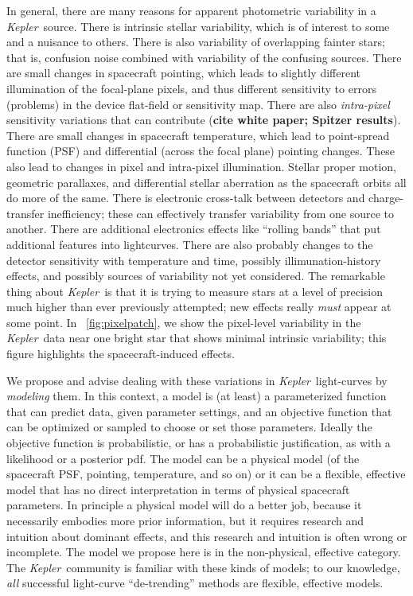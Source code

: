\documentclass[12pt, preprint]{aastex}
\newcommand{\project}[1]{\textsl{#1}}
\newcommand{\Kepler}{\project{Kepler}}
\newcommand{\todo}[1]{\textbf{#1}}
\begin{document}
In general, there are many reasons for apparent photometric variability in a \Kepler\ source.
There is intrinsic stellar variability,
  which is of interest to some and a nuisance to others.
There is also variability of overlapping fainter stars;
  that is, confusion noise combined with variability of the confusing sources.
There are small changes in spacecraft pointing,
  which leads to slightly different illumination of the focal-plane pixels,
  and thus different sensitivity to errors (problems) in the device flat-field or sensitivity map.
There are also \emph{intra-pixel} sensitivity variations that can contribute (\todo{cite white paper; Spitzer results}).
There are small changes in spacecraft temperature,
  which lead to point-spread function (PSF) and differential (across the focal plane) pointing changes.
These also lead to changes in pixel and intra-pixel illumination.
Stellar proper motion, geometric parallaxes, and differential stellar aberration as the spacecraft orbits all do more of the same.
There is electronic cross-talk between detectors and charge-transfer inefficiency;
  these can effectively transfer variability from one source to another.
There are additional electronics effects like ``rolling bands'' that put additional features into lightcurves.
There are also probably changes to the detector sensitivity with temperature and time,
  possibly illimunation-history effects,
  and possibly sources of variability not yet considered.
The remarkable thing about \Kepler\ is that it is trying to measure stars at a level of precision
  much higher than ever previously attempted;
  new effects really \emph{must} appear at some point.
In \figurename~\ref{fig:pixelpatch}, we show the pixel-level variability in the \Kepler\ data
  near one bright star that shows minimal intrinsic variability;
  this figure highlights the spacecraft-induced effects.

We propose and advise dealing with these variations in \Kepler\ light-curves by \emph{modeling} them.
In this context, a model is (at least) a parameterized function that can predict data, given parameter settings,
  and an objective function that can be optimized or sampled to choose or set those parameters.
Ideally the objective function is probabilistic, or has a probabilistic justification,
  as with a likelihood or a posterior pdf.
The model can be a physical model (of the spacecraft PSF, pointing, temperature, and so on)
  or it can be a flexible, effective model that has no direct interpretation in terms of physical spacecraft parameters.
In principle a physical model will do a better job,
  because it necessarily embodies more prior information,
  but it requires research and intuition about dominant effects,
  and this research and intuition is often wrong or incomplete.
The model we propose here is in the non-physical, effective category.
The \Kepler\ community is familiar with these kinds of models;
  to our knowledge, \emph{all} successful light-curve ``de-trending'' methods
  are flexible, effective models.
\end{document}
